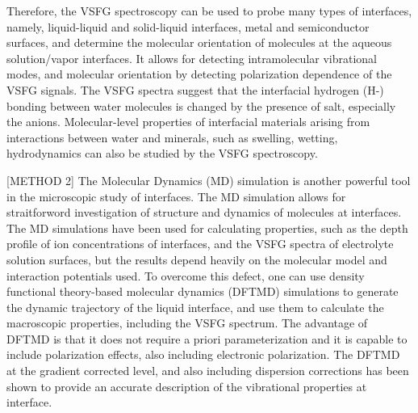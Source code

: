 Therefore, the VSFG spectroscopy can be used to probe many types of interfaces, namely, liquid-liquid and 
solid-liquid interfaces\cite{Guyot-Sionnest1987,RS91,Du93,QD94,Richmond02,Gopalakrishnan2006,ShenYR2006,Morita2008}, metal and semiconductor surfaces\cite{Harris87,Superfine88},
and determine the molecular orientation of molecules at the aqueous solution/vapor interfaces.
It allows for detecting intramolecular vibrational modes, and molecular orientation by detecting polarization dependence of the VSFG signals\cite{Vidal05}.  
The VSFG spectra suggest that the interfacial hydrogen (H-) bonding between water molecules is changed by the presence of salt, 
especially the anions\cite{EAR04}.
Molecular-level properties of interfacial materials arising from interactions between water and minerals, 
such as swelling, wetting, hydrodynamics can also be studied by the VSFG spectroscopy\cite{Rotenberg14}.

[METHOD 2]
The Molecular Dynamics (MD) simulation is another powerful tool in the microscopic study of interfaces.
The MD simulation allows for straitforword investigation of structure and dynamics of molecules at interfaces\cite{Morita2008}.
The MD simulations have been used for calculating properties, 
such as the depth profile of ion concentrations of interfaces\cite{Jungwirth2001,Jungwirth2002}, and the VSFG spectra 
of electrolyte solution surfaces\cite{Gopalakrishnan2006,Johnson2014,Ishiyama2014,Ishiyama2017},
but the results depend heavily on the molecular model and interaction potentials used\cite{LXD03,MKP04,TI07,MM05}.
To overcome this defect, one can use density functional theory-based molecular dynamics (DFTMD) simulations to generate the dynamic trajectory of 
the liquid interface, and use them to calculate the macroscopic properties, including the VSFG spectrum.  
The advantage of DFTMD is that it does not require a priori parameterization and it is capable to include polarization effects\cite{Ufimtsev2011},
also including electronic polarization. The DFTMD at the gradient corrected level, and also including dispersion corrections\cite{Grimme04,Grimme06,Grimme07,Grimme10,Baer2011}
has been shown to provide an accurate description of the vibrational properties at interface\cite{Fornaro2015}.

